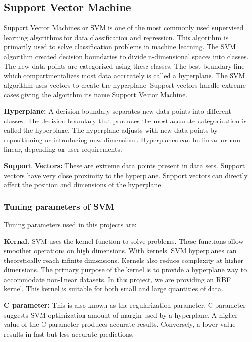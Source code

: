 \subsection{Support Vector Machine} \label{subsec:support_vector_machine}
Support Vector Machines or SVM is one of the most commonly used supervised learning algorithms for data classification and regression. This algorithm is primarily used to solve classification problems in machine learning. The SVM algorithm created decision boundaries to divide n-dimensional spaces into classes. The new data points are categorized using these classes. The best boundary line which compartmentalizes most data accurately is called a hyperplane. The SVM algorithm uses vectors to create the hyperplane. Support vectors handle extreme cases giving the algorithm its name Support Vector Machine.

\vspace{-1em}
\textbf{Hyperplane:} A decision boundary separates new data points into different classes. The decision boundary that produces the most accurate categorization is called the hyperplane. The hyperplane adjusts with new data points by repositioning or introducing new dimensions. Hyperplanes can be linear or non-linear, depending on user requirements.

\vspace{-1em}
\textbf{Support Vectors:} These are extreme data points present in data sets. Support vectors have very close proximity to the hyperplane. Support vectors can directly affect the position and dimensions of the hyperplane.

\subsubsection{Tuning parameters of SVM}
\vspace{-0.5em}
Tuning parameters used in this projects are:

\vspace{-1em}
\textbf{Kernal:} SVM uses the kernel function to solve problems. These functions allow smoother operations on high dimensions. With kernels, SVM hyperplanes can theoretically reach infinite dimensions. Kernels also reduce complexity at higher dimensions. The primary purpose of the kernel is to provide a hyperplane way to accommodate non-linear datasets. In this project, we are providing an RBF kernel. This kernel is suitable for both small and large quantities of data.

\vspace{-1em}
\textbf{C parameter:} This is also known as the regularization parameter. C parameter suggests SVM optimization amount of margin used by a hyperplane. A higher value of the C parameter produces accurate results. Conversely, a lower value results in fast but less accurate predictions.

